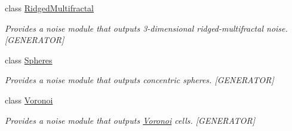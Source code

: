 \begin{DoxyCompactItemize}
class \hyperlink{class_lib_noise_1_1_generator_1_1_ridged_multifractal}{Ridged\+Multifractal}
\begin{DoxyCompactList}\small\item\em Provides a noise module that outputs 3-\/dimensional ridged-\/multifractal noise. \mbox{[}G\+E\+N\+E\+R\+A\+T\+OR\mbox{]} \end{DoxyCompactList}\item 
class \hyperlink{class_lib_noise_1_1_generator_1_1_spheres}{Spheres}
\begin{DoxyCompactList}\small\item\em Provides a noise module that outputs concentric spheres. \mbox{[}G\+E\+N\+E\+R\+A\+T\+OR\mbox{]} \end{DoxyCompactList}\item 
class \hyperlink{class_lib_noise_1_1_generator_1_1_voronoi}{Voronoi}
\begin{DoxyCompactList}\small\item\em Provides a noise module that outputs \hyperlink{class_lib_noise_1_1_generator_1_1_voronoi}{Voronoi} cells. \mbox{[}G\+E\+N\+E\+R\+A\+T\+OR\mbox{]} \end{DoxyCompactList}\end{DoxyCompactItemize}
